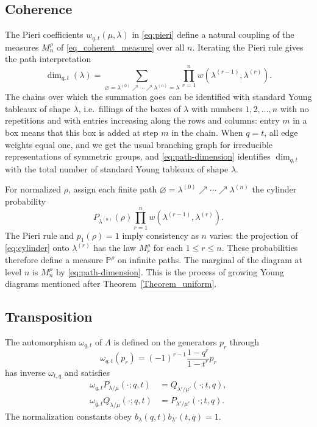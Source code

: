 \documentclass[11pt,reqno]{amsart}
\theoremstyle{definition}
\theoremstyle{remark}
\numberwithin{equation}{section}
\newcommand{\Prob}{\mathbb P}
\newcommand{\ddim}{\operatorname{dim}_{q,t}}
\begin{document}
\subsection{Coherence}\label{Section_coherence}

The Pieri coefficients $w_{q,t}(\mu,\lambda)$ in \eqref{eq:pieri}
define a natural coupling of the measures $M_n^\rho$ of \eqref{eq_coherent_measure} over all $n$.
Iterating the Pieri rule gives the path interpretation
\begin{equation}\label{eq:path-dimension}
 \ddim(\lambda)=
 \sum_{\varnothing=\lambda^{(0)}\nearrow\cdots\nearrow\lambda^{(n)}=\lambda}
 \prod_{r=1}^nw(\lambda^{(r-1)},\lambda^{(r)}).
\end{equation}
The chains over which the summation goes can be identified with standard Young tableaux of shape $\lambda$, i.e.\ fillings of the boxes of $\lambda$ with numbers $1,2,\dots,n$ with no repetitions and with entries increasing along the rows and columns: entry $m$ in a box means that this box is added at step $m$ in the chain. When $q=t$, all edge weights equal one, and we get the usual
branching graph for irreducible representations of symmetric groups, and \eqref{eq:path-dimension} identifies $\ddim$ with the total number of standard Young tableaux of shape $\lambda$.

For normalized $\rho$, assign each finite path
$\varnothing=\lambda^{(0)}\nearrow\cdots\nearrow\lambda^{(n)}$ the
cylinder probability
\begin{equation}\label{eq:cylinder}
 P_{\lambda^{(n)}}(\rho)
 \prod_{r=1}^nw(\lambda^{(r-1)},\lambda^{(r)}).
\end{equation}
The Pieri rule and $p_1(\rho)=1$ imply consistency as $n$ varies: the projection of \eqref{eq:cylinder} onto $\lambda^{(r)}$ has the law $M_r^\rho$ for each $1\le r \le n$.
These probabilities therefore define a measure $\Prob^\rho$ on infinite
paths. The marginal of the diagram at level $n$ is $M_n^\rho$ by \eqref{eq:path-dimension}.
This is the process of growing Young diagrams mentioned after Theorem~\ref{Theorem_uniform}.

\subsection{Transposition}
\label{Section_transposition}

The automorphism $\omega_{q,t}$ of $\Lambda$ is defined on the generators $p_r$ through
\begin{equation}\label{eq:omega}
 \omega_{q,t}(p_r)=(-1)^{r-1}\frac{1-q^r}{1-t^r}p_r
\end{equation}
has inverse $\omega_{t,q}$ and satisfies
\begin{equation}\label{eq:duality}
 \begin{split}
 \omega_{q,t}P_{\lambda/\mu}(\cdot;q,t)
 &=Q_{\lambda'/\mu'}(\cdot;t,q),\\
 \omega_{q,t}Q_{\lambda/\mu}(\cdot;q,t)
 &=P_{\lambda'/\mu'}(\cdot;t,q).
 \end{split}
\end{equation}
The normalization constants obey
$b_\lambda(q,t)b_{\lambda'}(t,q)=1$.
\end{document}
